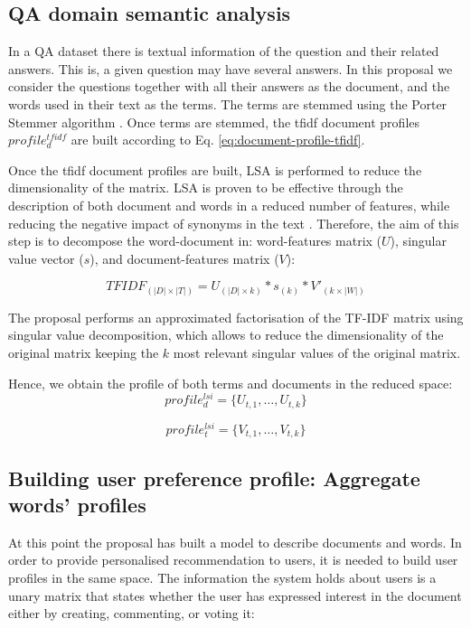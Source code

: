 \documentclass[preprint]{elsarticle}
\begin{document}
\begin{spacing}{1.5}
\subsection{QA domain semantic analysis}

In a QA dataset there is textual information of the question and their related answers. This is, a given question may have several answers. In this proposal we consider the questions together with all their answers as the document, and the words used in their text as the terms. The terms are stemmed using the Porter Stemmer algorithm \citep{Porter1980}. Once terms are stemmed, the tfidf document profiles $profile^{tfidf}_{d}$ are built according to Eq. \ref{eq:document-profile-tfidf}.

Once the tfidf document profiles are built, LSA is performed to reduce the dimensionality of the matrix. LSA is proven to be effective through the description of both document and words in a reduced number of features, while reducing the negative impact of synonyms in the text \cite{}. Therefore, the aim of this step is to decompose the word-document in: word-features matrix ($U$), singular value vector ($s$), and document-features matrix ($V$):

\begin{equation}
	TFIDF_{(|D|\times|T|)} = U_{(|D|\times k)} * s_{(k)} * V'_{(k \times |W|)}
\end{equation}

The proposal performs an approximated factorisation of the TF-IDF matrix using singular value decomposition, which allows to reduce the dimensionality of the original matrix keeping the $k$ most relevant singular values of the original matrix.

Hence, we obtain the profile of both terms and documents in the reduced space:
\begin{equation}
	profile^{lsi}_d = \{ U_{t,1},\dots, U_{t,k}\}
\end{equation}

\begin{equation}
	profile^{lsi}_t = \{ V_{t,1},\dots, V_{t,k}\}
\end{equation}

\subsection{Building user preference profile: Aggregate words' profiles}

At this point the proposal has built a model to describe documents and words. In order to provide personalised recommendation to users, it is needed to build user profiles in the same space. The information the system holds about users is a unary matrix that states whether the user has expressed interest in the document either by creating, commenting, or voting it:


\end{spacing}
\end{document}
